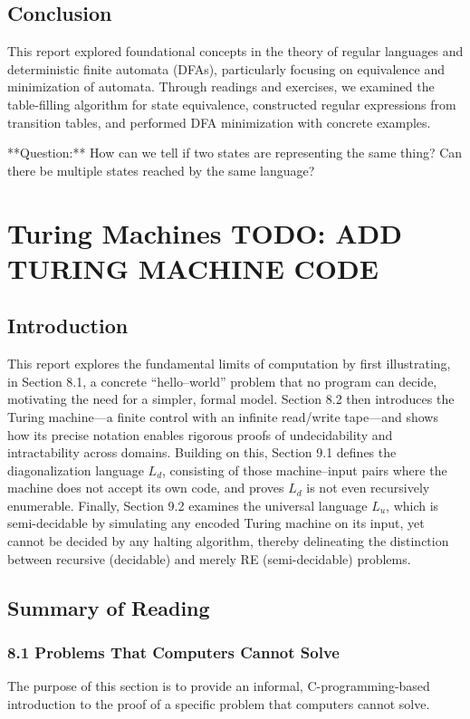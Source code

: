 \documentclass{article}
\begin{document}
\subsection{Conclusion}
This report explored foundational concepts in the theory of regular languages and deterministic finite automata (DFAs), particularly focusing on equivalence and minimization of automata. Through readings and exercises, we examined the table-filling algorithm for state equivalence, constructed regular expressions from transition tables, and performed DFA minimization with concrete examples.

**Question:** How can we tell if two states are representing the same thing? Can there be multiple states reached by the same language?

\section{Turing Machines TODO: ADD TURING MACHINE CODE}

\subsection{Introduction}
This report explores the fundamental limits of computation by first illustrating, in Section 8.1, a concrete “hello–world” problem that no program can decide, motivating the need for a simpler, formal model. Section 8.2 then introduces the Turing machine—a finite control with an infinite read/write tape—and shows how its precise notation enables rigorous proofs of undecidability and intractability across domains. Building on this, Section 9.1 defines the diagonalization language \(L_{d}\), consisting of those machine–input pairs where the machine does not accept its own code, and proves \(L_{d}\) is not even recursively enumerable. Finally, Section 9.2 examines the universal language \(L_{u}\), which is semi-decidable by simulating any encoded Turing machine on its input, yet cannot be decided by any halting algorithm, thereby delineating the distinction between recursive (decidable) and merely RE (semi-decidable) problems.

\subsection*{Summary of Reading}

\subsubsection*{8.1 Problems That Computers Cannot Solve}
The purpose of this section is to provide an informal, C-programming-based introduction to the proof of a specific problem that computers cannot solve.
\end{document}
